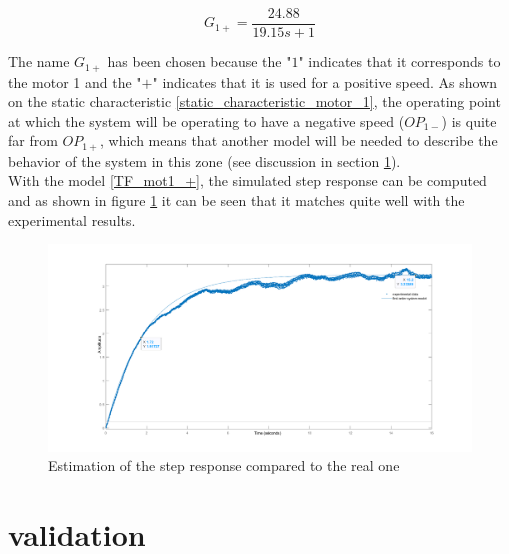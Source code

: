\begin{equation}
    G_{1+} = \frac{24.88}{19.15s + 1}
    \label{TF_mot1_+}
\end{equation}

The name $G_{1+}$ has been chosen because the "\textit{$1$}" indicates that it corresponds to the motor 1 and the 
"\textit{$+$}" indicates that it is used for a positive speed. As shown on the static characteristic 
\ref{static_characteristic_motor_1}, the operating point at which the system will be operating to have a negative speed 
($OP_{1-}$) is quite far from $OP_{1+}$, which means that another model will be needed to describe the behavior of the 
system in this zone (see discussion in section \ref{section_validation}).\\

With the model \ref{TF_mot1_+}, the simulated step response can be computed and as shown in figure 
\ref{estimated_step_response_positive_motor_1} it can be seen that it matches quite well with the experimental results.

\begin{figure}[H]
    \centering
    \includegraphics[height=\textheight/3]{Pictures/first_order_model_positive_motor_1.png}
    \caption{Estimation of the step response compared to the real one}
    \label{estimated_step_response_positive_motor_1}
\end{figure}

\section{validation}
\label{section_validation}


